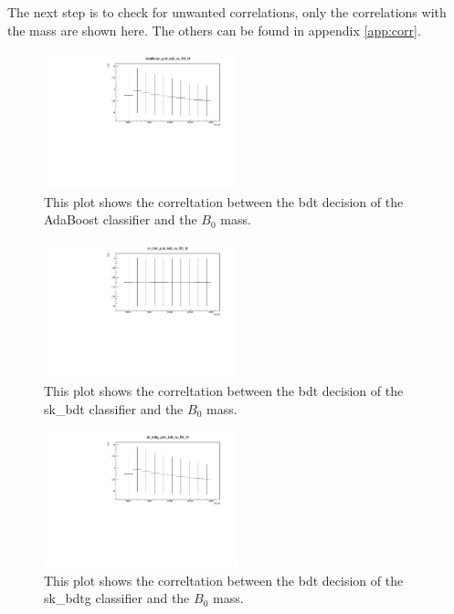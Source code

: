 \documentclass[english]{uzhpub}
\begin{document}
The next step is to check for unwanted correlations, only the correlations with the mass are shown here. The others can be found in appendix \ref{app:corr}.
\begin{figure}[H]
  \centering
  \includegraphics[width=0.5\textwidth]{plots/AdaBoost_plot_bdt_vs_B0_M}
  \caption{This plot shows the correltation between the bdt decision of the AdaBoost classifier and the $B_0$ mass.}
  \label{fig:AdaB0M}
\end{figure}

\begin{figure}[H]
  \centering
  \includegraphics[width=0.5\textwidth]{plots/sk_bdt_plot_bdt_vs_B0_M}
  \caption{This plot shows the correltation between the bdt decision of the sk\_bdt classifier and the $B_0$ mass.}
  \label{fig:skbdtB0M}
\end{figure}

\begin{figure}[H]
  \centering
  \includegraphics[width=0.5\textwidth]{plots/sk_bdtg_plot_bdt_vs_B0_M}
  \caption{This plot shows the correltation between the bdt decision of the sk\_bdtg classifier and the $B_0$ mass.}
  \label{fig:skbdtgB0M}
\end{figure}
\end{document}
